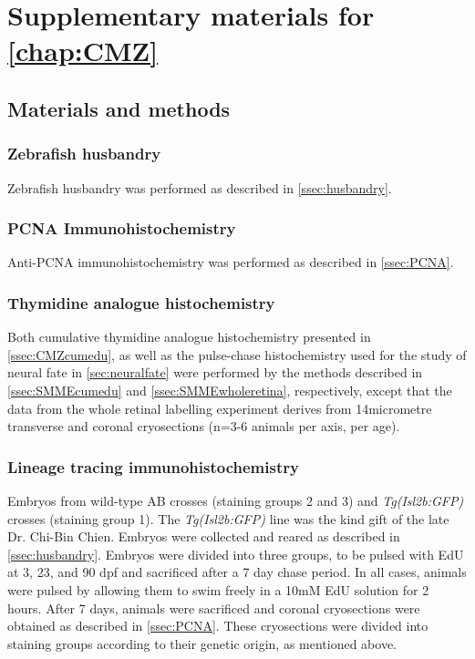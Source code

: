 \chapter{Supplementary materials for \autoref{chap:CMZ}}
\section{Materials and methods}
\subsection{Zebrafish husbandry}
Zebrafish husbandry was performed as described in \autoref{ssec:husbandry}.
\subsection{PCNA Immunohistochemistry}
Anti-PCNA immunohistochemistry was performed as described in \autoref{ssec:PCNA}.
\subsection{Thymidine analogue histochemistry}
Both cumulative thymidine analogue histochemistry presented in \autoref{ssec:CMZcumedu}, as well as the pulse-chase histochemistry used for the study of neural fate in \autoref{sec:neuralfate} were performed by the methods described in \autoref{ssec:SMMEcumedu} and \autoref{ssec:SMMEwholeretina}, respectively, except that the data from the whole retinal labelling experiment derives from 14\si{micro}{metre} transverse and coronal cryosections (n=3-6 animals per axis, per age). 

\subsection{Lineage tracing immunohistochemistry}
Embryos from wild-type AB crosses (staining groups 2 and 3) and \textit{Tg(Isl2b:GFP)} crosses (staining group 1). The \textit{Tg(Isl2b:GFP)} line was the kind gift of the late Dr. Chi-Bin Chien. Embryos were collected and reared as described in \autoref{ssec:husbandry}. Embryos were divided into three groups, to be pulsed with EdU at 3, 23, and 90 dpf and sacrificed after a 7 day chase period. In all cases, animals were pulsed by allowing them to swim freely in a 10mM EdU solution for 2 hours. After 7 days, animals were sacrificed and coronal cryosections were obtained as described in \autoref{ssec:PCNA}. These cryosections were divided into staining groups according to their genetic origin, as mentioned above.

